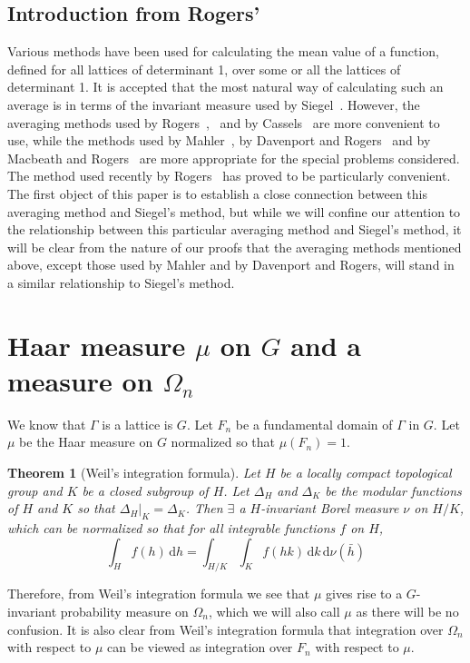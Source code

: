 \documentclass[11pt]{article}
\newtheorem{theorem}{Theorem}[section]
\theoremstyle{definition}
\theoremstyle{proof}
\begin{document}
\subsection{Introduction from Rogers'~\cite{rogers55b}}
Various methods have been used for calculating the mean value of a function, defined for all lattices of determinant 1, over some or all the lattices of determinant 1.
It is accepted that the most natural way of calculating such an average is in terms of the invariant measure used by Siegel~\cite{siegel45}.
However, the averaging methods used by Rogers~\cite{rogers47},~\cite{rogers55a} and by Cassels~\cite{cassels53} are more convenient to use, while the methods used by Mahler~\cite{mahler46}, by Davenport and Rogers~\cite{davenportrogers47} and by Macbeath and Rogers~\cite{macbeathrogers55} are more appropriate for the special problems considered.
The method used recently by Rogers~\cite{rogers55a} has proved to be particularly convenient.
The first object of this paper is to establish a close connection between this averaging method and Siegel's method, but while we will confine our attention to the relationship between this particular averaging method and Siegel's method, it will be clear from the nature of our proofs that the averaging methods mentioned above, except those used by Mahler and by Davenport and Rogers, will stand in a similar relationship to Siegel's method.

\section{Haar measure $\mu$ on $G$ and a measure on ${\Omega}_n$}
We know that $\Gamma$ is a lattice is $G$.
Let $F_n$ be a fundamental domain of $\Gamma$ in $G$.
Let $\mu$ be the Haar measure on $G$ normalized so that $\mu (F_n)=1$.

\begin{theorem}[Weil's integration formula]\label{thm}
    Let $H$ be a locally compact topological group and $K$ be a closed subgroup of $H$.
    Let $\Delta_H$ and $\Delta _K$ be the modular functions of $H$ and $K$ so that $\Delta _H\big|_K = \Delta _K$.
    Then $\exists$ a $H$-invariant Borel measure $\nu$ on $H/K$, which can be normalized so that for all integrable functions $f$ on $H$,
    \[
        \int_{H}f(h) \, \mathrm{d} h = \int_{H/K}\int_{K}f(hk) \, \mathrm{d} k \, \mathrm{d} \nu (\bar{h})
    \]
\end{theorem}

Therefore, from Weil's integration formula we see that $\mu$ gives rise to a $G$-invariant probability measure on ${\Omega}_n$, which we will also call $\mu$ as there will be no confusion.
It is also clear from Weil's integration formula that integration over ${\Omega}_n$ with respect to $\mu$ can be viewed as integration over $F_n$ with respect to $\mu$.
\end{document}
